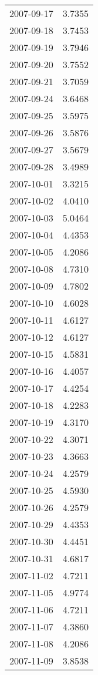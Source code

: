 \begin{tabular}{lr}
2007-09-17 &      3.7355 \\
2007-09-18 &      3.7453 \\
2007-09-19 &      3.7946 \\
2007-09-20 &      3.7552 \\
2007-09-21 &      3.7059 \\
2007-09-24 &      3.6468 \\
2007-09-25 &      3.5975 \\
2007-09-26 &      3.5876 \\
2007-09-27 &      3.5679 \\
2007-09-28 &      3.4989 \\
2007-10-01 &      3.3215 \\
2007-10-02 &      4.0410 \\
2007-10-03 &      5.0464 \\
2007-10-04 &      4.4353 \\
2007-10-05 &      4.2086 \\
2007-10-08 &      4.7310 \\
2007-10-09 &      4.7802 \\
2007-10-10 &      4.6028 \\
2007-10-11 &      4.6127 \\
2007-10-12 &      4.6127 \\
2007-10-15 &      4.5831 \\
2007-10-16 &      4.4057 \\
2007-10-17 &      4.4254 \\
2007-10-18 &      4.2283 \\
2007-10-19 &      4.3170 \\
2007-10-22 &      4.3071 \\
2007-10-23 &      4.3663 \\
2007-10-24 &      4.2579 \\
2007-10-25 &      4.5930 \\
2007-10-26 &      4.2579 \\
2007-10-29 &      4.4353 \\
2007-10-30 &      4.4451 \\
2007-10-31 &      4.6817 \\
2007-11-02 &      4.7211 \\
2007-11-05 &      4.9774 \\
2007-11-06 &      4.7211 \\
2007-11-07 &      4.3860 \\
2007-11-08 &      4.2086 \\
2007-11-09 &      3.8538 \\

\end{tabular}
